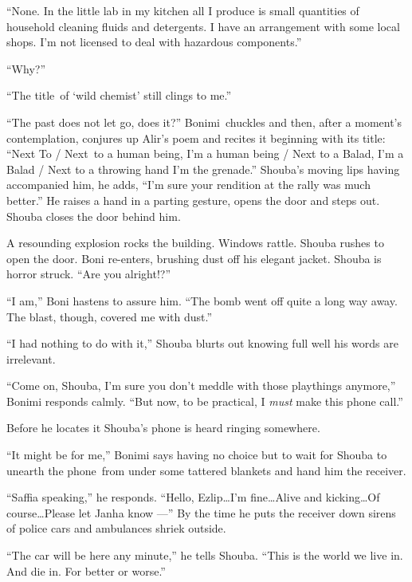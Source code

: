 \documentclass[twoside,11pt]{book}
\begin{document}
``None. In the little lab in my kitchen all I produce is small quantities of household cleaning fluids and
detergents. I have an arrangement with some local shops. I'm not licensed to deal with hazardous
components.''

``Why?''

``The title~of {}`wild chemist' still clings to me.''

``The past does not let go, does it?'' Bonimi~chuckles and then, after a moment's
contemplation, conjures up Alir's poem and recites it beginning with its title: ``Next To / Next~to a
human being, I'm a human being / Next to a Balad, I'm a Balad / Next to a throwing hand I'm the grenade.''
Shouba's moving lips having accompanied him, he adds, ``I'm sure your rendition at the rally was much
better.'' He raises a hand in a parting gesture, opens the door and steps out. Shouba closes the door
behind him.

A resounding explosion rocks the building. Windows rattle. Shouba rushes to open the door. Boni re-enters, brushing dust
off his elegant jacket. Shouba is horror struck. ``Are you alright!?''

``I am,'' Boni hastens to assure him. {}``The bomb went off quite a long way away. The blast, though,
covered me with dust.''

``I had nothing to do with it,'' Shouba blurts out knowing full well his words are irrelevant.

``Come on, Shouba, I'm sure you don't meddle with those playthings anymore,'' Bonimi responds
calmly.  ``But now, to be practical, I \textit{must }make this phone call.''

 Before he locates it Shouba's phone is heard ringing somewhere.

``It might be for me,'' Bonimi says having no choice but to wait for Shouba to unearth the
phone~from under some tattered{ }blankets and hand him the receiver.

``Saffia speaking,'' he responds. ``Hello, Ezlip{\ldots}I'm fine{\ldots}Alive and
kicking{\ldots}Of course{\ldots}Please let Janha know ---'' By the time he puts the receiver down sirens of
police cars and ambulances shriek outside.

``The car will be here any minute,'' he tells Shouba. ``This is the world we live
in. And die in. For better or worse.''


\bigskip

\chapter{}
\end{document}
